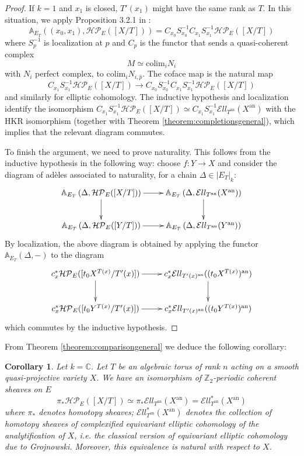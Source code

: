 \documentclass[11pt,letterpaper]{amsart}
\newtheorem{corollary}[dummy]{Corollary}
\newcommand{\bA}{\mathbb{A}}
\newcommand{\bC}{\mathbb{C}}
\newcommand{\bZ}{\mathbb{Z}}
\newcommand{\cHP}{\mathcal{HP}}
\newcommand{\El}{\mathcal{E}ll}
\newcommand{\an}{\mathrm{an}}
\newcommand{\colim}{\mathrm{colim}}
\begin{document}
\begin{proof}
If $k=1$ and $x_1$ is closed, $T'(x_1)$ might have the same rank as $T$. In this situation, we apply Proposition 3.2.1 in \cite{HubAd}:
$$\bA_{E_T}\left ((x_0,x_1),\cHP_{E}([X/T])\right )=C_{x_0}S_{x_0}^{-1}C_{x_1}S_{x_1}^{-1}\cHP_{E}([X/T])$$
where $S_{p}^{-1}$ is localization at $p$ and $C_{p}$ is the functor that sends a quasi-coherent complex 
$$M \simeq \colim_{i}N_i$$ with $N_i$ perfect complex, to $\colim_{i}N_{i,\widehat{p}}$. The coface map is the natural map
$$C_{x_1}S_{x_1}^{-1}\cHP_{E}([X/T])\to C_{x_0}S_{x_0}^{-1}C_{x_1}S_{x_1}^{-1}\cHP_{E}([X/T])$$
and similarly for elliptic cohomology.
The inductive hypothesis and localization identify the isomorphism $C_{x_1}S_{x_1}^{-1}\cHP_{E}([X/T])\simeq C_{x_1}S_{x_1}^{-1}\El_{T^\an}(X^\an)$ with the HKR isomorphism (together with Theorem \ref{theorem:completionsgeneral}), which implies that the relevant diagram commutes.

To finish the argument, we need to prove naturality.
This follows from the inductive hypothesis in the following way: choose $f:Y\to X$ and consider the diagram of ad\`eles associated to naturality, for a chain $\Delta\in |E_T|_k$:
$$\xymatrix{
\bA_{E_T}\left (\Delta,\cHP_E([X/T])\right )\ar[r]\ar[d] & \bA_{E_T}\left (\Delta,\El_{T^{\an}}(X^{\an})\right )\ar[d] \\
\bA_{E_T}\left (\Delta,\cHP_E([Y/T])\right )\ar[r] & \bA_{E_T}\left (\Delta,\El_{T^{\an}}(Y^{\an})\right )
}
$$
By localization, the above diagram is obtained by applying the functor $\bA_{E_T}(\Delta,-)$ to the diagram
$$\xymatrix{
c_x^\ast\cHP_E([t_0 X^{T(x)}/T'(x)])\ar[r]\ar[d] & c_x^\ast\El_{T'(x)^{\an}}((t_0 X^{T(x)})^{\an})\ar[d] \\
c_x^\ast\cHP_E([t_0 Y^{T(x)}/T'(x)])\ar[r] & c_x^\ast\El_{T'(x)^{\an}}((t_0 Y^{T(x)})^{\an})
}
$$
which commutes by the inductive hypothesis. 
\end{proof}

From Theorem \ref{theorem:comparisongeneral} we deduce the following corollary:

\begin{corollary}
Let $k=\bC$. Let $T$ be an algebraic torus of rank $n$ acting on a smooth quasi-projective variety $X$.
We have an isomorphism of $\bZ_2$-periodic coherent sheaves on $E$
$$\pi_{\ast}\cHP_E([X/T])\simeq\pi_\ast\El_{T^{\an}}(X^{\an})=\El_{T^{\an}}^{\ast}(X^{\an})$$
where $\pi_{\ast}$ denotes homotopy sheaves; $\El_{T^{\an}}^{\ast}(X^{\an})$ denotes the collection of homotopy sheaves of complexified equivariant elliptic cohomology of the analytification of $X$, i.e. the classical version of equivariant elliptic cohomology due to Grojnowski. Moreover, this equivalence is natural with respect to $X$. 
\end{corollary}
\end{document}
